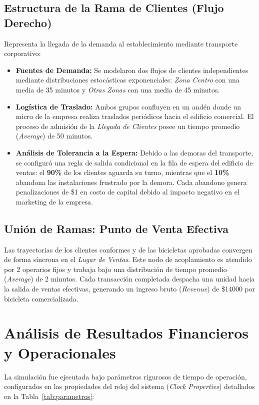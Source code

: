 \documentclass[runningheads]{llncs}
\begin{document}
\subsection{Estructura de la Rama de Clientes (Flujo Derecho)}
Representa la llegada de la demanda al establecimiento mediante transporte corporativo:
\begin{itemize}
    \item \textbf{Fuentes de Demanda:} Se modelaron dos flujos de clientes independientes mediante distribuciones estocásticas exponenciales: \textit{Zona Centro} con una media de 35 minutos y \textit{Otras Zonas} con una media de 45 minutos.
    \item \textbf{Logística de Traslado:} Ambos grupos confluyen en un andén donde un micro de la empresa realiza traslados periódicos hacia el edificio comercial. El proceso de admisión de la \textit{Llegada de Clientes} posee un tiempo promedio (\textit{Average}) de 50 minutos.
    \item \textbf{Análisis de Tolerancia a la Espera:} Debido a las demoras del transporte, se configuró una regla de salida condicional en la fila de espera del edificio de ventas: el \textbf{90\%} de los clientes aguarda su turno, mientras que el \textbf{10\%} abandona las instalaciones frustrado por la demora. Cada abandono genera penalizaciones de \$1 en costo de capital debido al impacto negativo en el marketing de la empresa.
\end{itemize}

\subsection{Unión de Ramas: Punto de Venta Efectiva}
Las trayectorias de los clientes conformes y de las bicicletas aprobadas convergen de forma síncrona en el \textit{Lugar de Ventas}. Este nodo de acoplamiento es atendido por 2 operarios fijos y trabaja bajo una distribución de tiempo promedio (\textit{Average}) de 2 minutos. Cada transacción completada despacha una unidad hacia la salida de ventas efectivas, generando un ingreso bruto (\textit{Revenue}) de \$14000 por bicicleta comercializada.

\section{Análisis de Resultados Financieros y Operacionales}
La simulación fue ejecutada bajo parámetros rigurosos de tiempo de operación, configurados en las propiedades del reloj del sistema (\textit{Clock Properties}) detallados en la Tabla~\ref{tab:parametros}:
\end{document}

